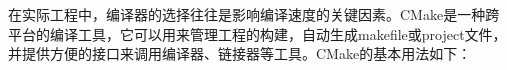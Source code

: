 在实际工程中，编译器的选择往往是影响编译速度的关键因素。CMake是一种跨平台的编译工具，它可以用来管理工程的构建，自动生成makefile或project文件，并提供方便的接口来调用编译器、链接器等工具。CMake的基本用法如下：

